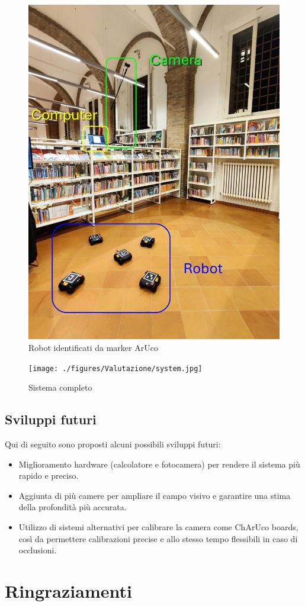 \documentclass[12pt,a4paper,openright,twoside]{book}
\begin{document}
\begin{figure}[h!]
	\centering
	\includegraphics[width=0.8\linewidth]{./figures/Valutazione/robot1.jpg}
	\caption{Robot identificati da marker ArUco}
	\label{fig:robot}
\end{figure}

\begin{figure}[h!]
	\centering
	\texttt{[image: ./figures/Valutazione/system.jpg]}
	\caption{Sistema completo}
	\label{fig:system}
\end{figure}

\section{Sviluppi futuri}
Qui di seguito sono proposti alcuni possibili sviluppi futuri:
\begin{itemize}
	\item Miglioramento hardware (calcolatore e fotocamera) per rendere il sistema più rapido e preciso.
	\item Aggiunta di più camere per ampliare il campo visivo e garantire una stima della profondità più accurata.
	\item Utilizzo di sistemi alternativi per calibrare la camera come ChArUco boards, così da permettere calibrazioni precise e allo stesso tempo flessibili in caso di occlusioni.
\end{itemize}
\chapter*{Ringraziamenti}


\backmatter

\printglossary[type=\acronymtype]
\printglossary
\printbibliography
\end{document}
